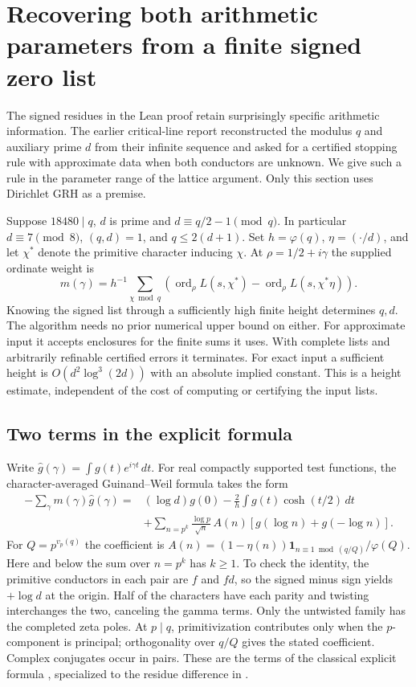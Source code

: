 \section{Recovering both arithmetic parameters from a finite signed zero list}
\label{sec:inverse}
The signed residues in the Lean proof retain surprisingly specific arithmetic
information. The earlier critical-line report \cite{priorzero} reconstructed the
modulus $q$ and auxiliary prime $d$ from their infinite sequence and asked for
a certified stopping rule with approximate data when both conductors are
unknown. We give such a rule in the parameter range of the lattice argument.
Only this section uses Dirichlet GRH as a premise.

\begin{theorem}\label{th:inverse}
Suppose $18480\mid q$, $d$ is prime and $d\equiv q/2-1\pmod q$.
In particular $d\equiv7\pmod8$, $(q,d)=1$, and $q\le2(d+1)$.
Set $h=\varphi(q)$, $\eta=(\cdot/d)$, and let $\chi^*$ denote the primitive
character inducing $\chi$. At $\rho=1/2+i\gamma$ the supplied ordinate weight is
\[
 m(\gamma)=h^{-1}\sum_{\chi\bmod q}
 \left(\operatorname{ord}_\rho L(s,\chi^*)-
       \operatorname{ord}_\rho L(s,\chi^*\eta)\right).
\]
Knowing the signed list through a sufficiently high finite height determines
$q,d$. The algorithm needs no prior numerical upper bound on either.
For approximate input it accepts enclosures for the finite sums it uses.
With complete lists and arbitrarily refinable certified errors it terminates.
For exact input a sufficient height is $O(d^2\log^3(2d))$ with an absolute
implied constant. This is a height estimate, independent of the cost of
computing or certifying the input lists.
\end{theorem}

\subsection*{Two terms in the explicit formula}
Write $\widehat g(\gamma)=\int g(t)e^{i\gamma t}\,dt$. For real compactly
supported test functions, the character-averaged Guinand--Weil formula takes
the form
\begin{align*}
 -\sum_\gamma m(\gamma)\widehat g(\gamma)
  ={}& (\log d)g(0)-\frac2h\int g(t)\cosh(t/2)\,dt\\
 &+\sum_{n=p^k}\frac{\log p}{\sqrt n}\,A(n)
                 [g(\log n)+g(-\log n)] .
\end{align*}
For $Q=p^{v_p(q)}$ the coefficient is
$A(n)=(1-\eta(n))\mathbf1_{n\equiv1\bmod(q/Q)}/\varphi(Q)$.
Here and below the sum over $n=p^k$ has $k\ge1$.
To check the identity, the primitive conductors in each pair are $f$ and $fd$,
so the signed minus sign yields $+\log d$ at the origin. Half of the characters
have each parity and twisting interchanges the two, canceling the gamma terms.
Only the untwisted family has the completed zeta poles. At $p\mid q$,
primitivization contributes only when the $p$-component is principal;
orthogonality over $q/Q$ gives the stated coefficient. Complex conjugates
occur in pairs. These are the terms of the classical explicit formula
\cite{chirre,booker}, specialized to the residue difference in
.

